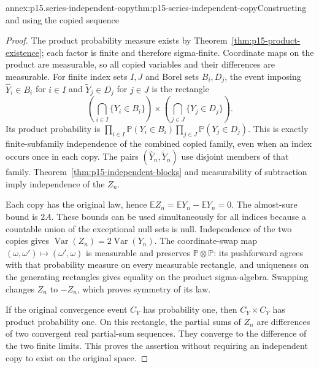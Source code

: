 \begin{annexitem}{annex:p15.series-independent-copy}{thm:p15-series-independent-copy}{Constructing and using the copied sequence}
\begin{proof}
The product probability measure exists by
Theorem~\ref{thm:p15-product-existence}; each factor is finite and
therefore sigma-finite. Coordinate maps on the product are measurable,
so all copied variables and their differences are measurable.
For finite index sets \(I,J\) and Borel sets \(B_i,D_j\), the
event imposing \(\widehat Y_i\in B_i\) for \(i\in I\) and
\(\widetilde Y_j\in D_j\) for \(j\in J\) is the rectangle
\[
 \left(\bigcap_{i\in I}\{Y_i\in B_i\}\right)
     \times\left(\bigcap_{j\in J}\{Y_j\in D_j\}\right).
\]
Its product probability is
\(\prod_{i\in I}\mathbb P(Y_i\in B_i)
  \prod_{j\in J}\mathbb P(Y_j\in D_j)\).
This is exactly finite-subfamily independence of the combined copied
family, even when an index occurs once in each copy.
The pairs \((\widehat Y_n,\widetilde Y_n)\) use disjoint members
of that family. Theorem~\ref{thm:p15-independent-blocks} and
measurability of subtraction imply independence of the \(Z_n\).

Each copy has the original law, hence
\(\mathbb EZ_n=\mathbb EY_n-\mathbb EY_n=0\).
The almost-sure bound is \(2A\). These bounds can be used
simultaneously for all indices because a countable union of the
exceptional null sets is null. Independence of the two copies gives
\(\operatorname{Var}(Z_n)=2\operatorname{Var}(Y_n)\).
The coordinate-swap map \((\omega,\omega')\mapsto(\omega',\omega)\)
is measurable and preserves \(\mathbb P\otimes\mathbb P\): its
pushforward agrees with that probability measure on every measurable
rectangle, and uniqueness on the generating rectangles gives equality
on the product sigma-algebra. Swapping changes \(Z_n\) to \(-Z_n\),
which proves symmetry of its law.

If the original convergence event \(C_Y\) has probability one,
then \(C_Y\times C_Y\) has product probability one. On this
rectangle, the partial sums of \(Z_n\) are differences of two
convergent real partial-sum sequences. They converge to the difference
of the two finite limits. This proves the assertion without requiring
an independent copy to exist on the original space.
\end{proof}
\end{annexitem}

